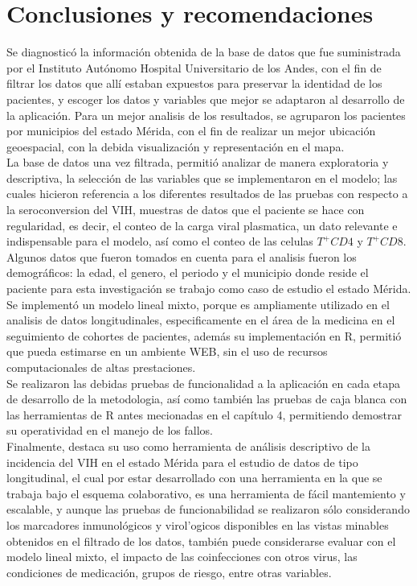 \chapter{Conclusiones y recomendaciones}

Se diagnostic\'o la informaci\'on obtenida de la base de datos que fue suministrada por el Instituto Aut\'onomo Hospital Universitario de los Andes, con el fin de filtrar los datos que all\'i estaban expuestos para preservar la identidad de los pacientes, y escoger los datos y variables que mejor se adaptaron al desarrollo de la aplicaci\'on. Para un mejor analisis de los resultados, se agruparon los pacientes por municipios del estado M\'erida, con el fin de realizar un mejor ubicaci\'on geoespacial, con la debida visualizaci\'on y representaci\'on en el mapa. \\

La base de datos una vez filtrada, permiti\'o analizar de manera exploratoria y descriptiva, la selecci\'on de las variables que se implementaron en el modelo; las cuales hicieron referencia a los diferentes resultados de las pruebas con respecto a la seroconversion del VIH, muestras de datos que el paciente se hace con regularidad, es decir, el conteo de la carga viral plasmatica, un dato relevante e indispensable para el modelo, as\'i como el conteo de las celulas $T^{+}CD4$ y  $T^{+}CD8$. Algunos datos que fueron tomados en cuenta para el analisis fueron los demogr\'aficos:  la edad, el genero, el periodo y el municipio donde reside el paciente para esta investigaci\'on se trabajo como caso de estudio el estado M\'erida. \\


Se implement\'o un modelo lineal mixto, porque es ampliamente utilizado en el analisis de datos longitudinales, especificamente en el \'area de la medicina en el seguimiento de cohortes de pacientes, además su implementaci\'on en R, permiti\'o que pueda estimarse en un ambiente WEB, sin el uso de recursos computacionales de altas prestaciones.\\

Se realizaron las debidas pruebas de funcionalidad a la aplicaci\'on en cada etapa de desarrollo de la metodologia, as\'i como tambi\'en las pruebas de caja blanca con las herramientas de R antes mecionadas en el capítulo 4, permitiendo demostrar su operatividad en el manejo de los fallos.\\

Finalmente, destaca su uso como herramienta de an\'alisis descriptivo de la incidencia del VIH en el estado M\'erida para el estudio de  datos de tipo  longitudinal, el cual por estar desarrollado con una herramienta en la que se trabaja bajo el esquema colaborativo, es una herramienta de fácil mantemiento y escalable, y aunque las pruebas de funcionabilidad se realizaron sólo considerando los marcadores inmunol\'ogicos y virol'ogicos disponibles en las vistas minables obtenidos en el filtrado de los datos, tambi\'en puede considerarse evaluar con el modelo lineal mixto, el impacto de las coinfecciones con otros virus, las condiciones de medicación, grupos de riesgo, entre otras variables.\\

